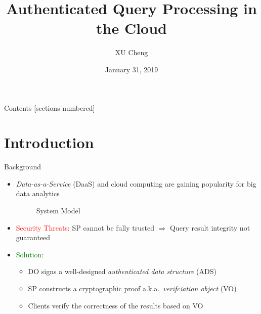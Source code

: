 \documentclass[xcolor={dvipsnames},aspectratio=169,10pt]{beamer}
\title{Authenticated Query Processing in the Cloud}
\author{XU Cheng}
\institute{Supervisor: Prof.~XU Jianliang}
\date{January 31, 2019}
\begin{document}
\maketitle%

\begin{frame}{Contents}
  [sections numbered]
  \tableofcontents[hideallsubsections]
\end{frame}

\section{Introduction}

\begin{frame}{Background}
  \begin{itemize}[<+->]
    \item \alert{\emph{Data-as-a-Service} (DaaS)} and \alert{cloud computing} are gaining popularity for big data analytics
      \begin{figure}
        
        \caption{System Model}
      \end{figure}
    \item \textcolor{Red}{Security Threats}: SP cannot be fully trusted $\Rightarrow$ Query result integrity not guaranteed
    \item \textcolor{Green}{Solution}:
      \begin{itemize}[<1->]
        \item DO signs a well-designed \alert{\emph{authenticated data structure} (ADS)}
        \item SP constructs a cryptographic proof a.k.a.\ \alert{\emph{verifciation object} (VO)}
        \item Clients verify the correctness of the results based on VO
      \end{itemize}
  \end{itemize}
\end{frame}
\end{document}
